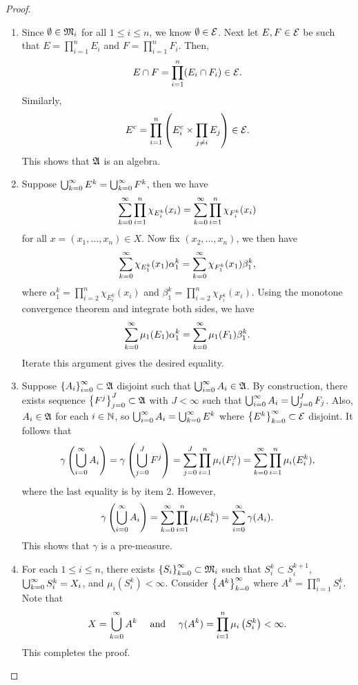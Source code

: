 \documentclass[a4paper]{article}
\begin{document}
\begin{proof}
\begin{enumerate}
\item Since $\emptyset \in \mathfrak{M}_i$ for all $1 \leq i \leq n$,
we know $\emptyset \in \mathcal{E}$. Next let $E, F \in \mathcal{E}$ be 
such that $E = \prod_{i=1}^n E_i$ and $F = \prod_{i=1}^n 
F_i$. Then,
\[
E \cap F = \prod_{i=1}^n (E_i \cap F_i) \in \mathcal{E}.
\]
Similarly, 
\[
E^c = \prod_{i=1}^n \left( E_i^c 
\times \prod_{j \neq i} E_j \right) \in \mathcal{E}.
\]
This shows that $\mathfrak{A}$ is an algebra.

\item Suppose $\bigcup_{k=0}^\infty E^k = \bigcup_{k=0}^\infty F^k$, then we have 
\[
\sum_{k=0}^\infty \prod_{i=1}^n \chi_{E_i^k}(x_i) 
= \sum_{k=0}^\infty \prod_{i=1}^n \chi_{F_i^k}(x_i)
\]
for all $x = (x_1, \dots, x_n) \in X$. 
Now fix $(x_2, \dots, x_n)$, we then have 
\[
\sum_{k=0}^\infty \chi_{E^k_1}(x_1) \alpha_1^k 
= \sum_{k=0}^\infty \chi_{F^k_1}(x_1) \beta_1^k, 
\]
where 
$\alpha_1^k = \prod_{i=2}^n \chi_{E_i^k} (x_i)$ and 
$\beta_1^k = \prod_{i=2}^n \chi_{F_i^k} (x_i)$.
Using the monotone convergence theorem and integrate 
both sides, we have 
\[
\sum_{k=0}^\infty \mu_1(E_1) \alpha_1^k 
= \sum_{k=0}^\infty \mu_1(F_1) \beta_1^k.
\]
Iterate this argument gives the desired equality.

\item Suppose $\left\{ A_i \right\}_{i=0}^\infty \subset \mathfrak{A}$ disjoint such that 
$\bigcup_{i=0}^\infty A_i \in \mathfrak{A}$. By construction, there exists 
sequence $\left\{ F^j \right\}_{j=0}^J \subset \mathfrak{A}$ with $J < \infty$ such that 
$\bigcup_{i=0}^\infty{A_i} = \bigcup_{j=0}^J F_j$. Also, $A_i \in \mathfrak{A}$ 
for each $i \in \mathbb{N}$, so $\bigcup_{i=0}^\infty A_i = \bigcup_{k=0}^\infty E^k$
where $\left\{ E^k \right\}_{k=0}^\infty \subset \mathcal{E}$ disjoint.
It follows that 
\[
\gamma \left( \bigcup_{i=0}^\infty A_i \right)
= \gamma \left( \bigcup_{j=0}^J F^j \right)
= \sum_{j=0}^J \prod_{i=1}^n \mu_i ( F_i^j )
= \sum_{k=0}^\infty \prod_{i=1}^n \mu_i (E_i^k),
\]
where the last equality is by item 2. However, 
\[
\gamma \left( \bigcup_{i=0}^\infty A_i \right) 
= \sum_{k=0}^\infty \prod_{i=1}^n \mu_i (E_i^k) 
= \sum_{i=0}^\infty \gamma (A_i).
\]
This shows that $\gamma$ is a pre-measure.

\item For each $1 \leq i \leq n$, there exists 
$\left\{ S_i \right\}_{k=0}^\infty \subset \mathfrak{M}_i$ such that 
$S_i^k \subset S_i^{k+1}$, 
$\bigcup_{k=0}^\infty S_i^k = X_i$, and $\mu_i(S_i^k) < \infty$.
Consider $\left\{ A^k \right\}_{k=0}^\infty$ where $A^k = \prod_{i=1}^n S_i^k$.
Note that 
\[
X = \bigcup_{k=0}^\infty A^k \quad \text{ and } \quad 
\gamma(A^k) = \prod_{i=1}^n \mu_i \left( S_i^k \right) < \infty.
\]
This completes the proof.

\end{enumerate}
\end{proof}
\end{document}
